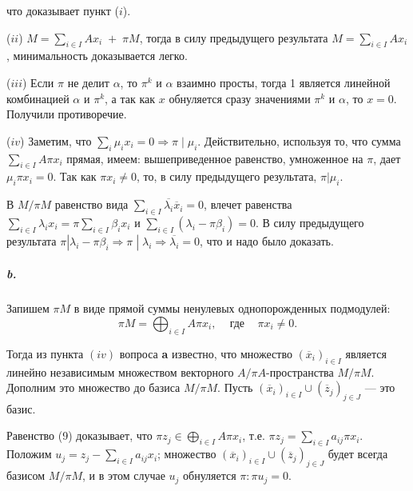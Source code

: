 {\noindent что доказывает пункт ($i$).

\par (\textit{$ii$}) $M = \sum_{i \in I}Ax_{i}\;+\;\pi M$, тогда в силу предыдущего результата\linebreak
$M = \sum_{i \in I}Ax_{i}$, минимальность доказывается легко.

\par (\textit{$iii$}) Если $\pi$ не делит $\alpha$, то $\pi^{k}$ и $\alpha$ взаимно просты, тогда 1 является
линейной комбинацией $\alpha$ и $\pi^{k}$, а так как $x$ обнуляется сразу значениями
$\pi^{k}$ и $\alpha$, то $x = 0$. Получили противоречие.

\par (\textit{$iv$}) Заметим, что $\sum_{i}\mu_{i}x_{i} = 0 \Rightarrow \pi \;|\; \mu_{i}$. Действительно, используя
то, что сумма $\sum_{i \in I}A\pi x_{i}$ прямая, имеем: вышеприведенное равенство,
умноженное на $\pi$, дает $\mu_{i}\pi x_{i} = 0$. Так как $\pi x_{i} \neq 0$, то, в силу предыдущего результата, $\pi | \mu_{i}$.

В $M/\pi M$ равенство вида $\sum_{i \in I}\overline{\lambda_{i}}\overline{x}_{i} = 0$, влечет равенства\linebreak
$\sum_{i \in I}\lambda_{i}x_{i} = \pi\sum_{i \in I}\beta_{i}x_{i}$ и $\sum_{i \in I}(\lambda_{i} - \pi\beta_{i}) = 0$. В силу предыдущего
результата $\pi |\lambda_{i} - \pi\beta_{i} \Rightarrow \pi \;|\; \lambda_{i} \Rightarrow \overline{\lambda_{i}} = 0$, что и надо было доказать.

\subparagraph{b.} Запишем $\pi M$ в виде прямой суммы ненулевых однопорожденных
подмодулей:
\begin{equation}
\pi M = \bigoplus_{i \in I} A\pi x_{i},\;\;\; \text{ где }\;\;\; \pi x_{i} \neq 0.
\end{equation}

\noindent Тогда из пункта $(iv)$ вопроса {\bf a} известно, что множество $(\overline{x}_{i})_{i \in I}$ является линейно независимым множеством векторного $A/\pi A$-пространства
$M/\pi M$. Дополним это множество до базиса $M/\pi M$. Пусть\linebreak
$(\overline{x}_{i})_{i \in I} \cup (\overline{z}_{j})_{j \in J}$ --- это базис.

Равенство (9) доказывает, что $\pi z_{j} \in \bigoplus_{i \in I}A\pi x_{i}$, т.е.
$\pi z_{j} = \sum_{i \in I}a_{ij}\pi x_{i}$. Положим $u_{j} = z_{j} - \sum_{i \in I}a_{ij}x_{i}$; множество
$(\overline{x}_{i})_{i \in I} \cup (\overline{z}_{j})_{j \in J}$ будет всегда базисом $M/\pi M$, и в этом случае $u_{j}$ обнуляется $\pi: \pi u_{j} = 0$.

}
